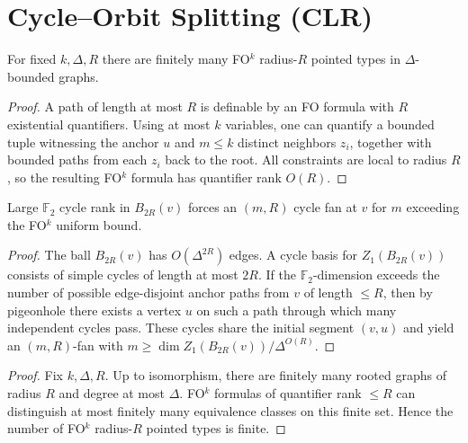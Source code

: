 \section*{Cycle--Orbit Splitting (CLR)}

\begin{lemma}
For fixed $k,\Delta,R$ there are finitely many FO$^k$ radius-$R$ pointed types in $\Delta$-bounded graphs.
\end{lemma}

\begin{proof}
A path of length at most $R$ is definable by an FO formula with $R$ existential quantifiers.
Using at most $k$ variables, one can quantify a bounded tuple witnessing the anchor $u$ and
$m\le k$ distinct neighbors $z_i$, together with bounded paths from each $z_i$ back to the root.
All constraints are local to radius $R$, so the resulting FO$^k$ formula has quantifier rank $O(R)$.
\end{proof}


\begin{lemma}
Large $\mathbb F_2$ cycle rank in $B_{2R}(v)$ forces an $(m,R)$ cycle fan at $v$ for $m$ exceeding the FO$^k$ uniform bound.
\end{lemma}

\begin{proof}
The ball $B_{2R}(v)$ has $O(\Delta^{2R})$ edges.
A cycle basis for $Z_1(B_{2R}(v))$ consists of simple cycles of length at most $2R$.
If the $\mathbb F_2$-dimension exceeds the number of possible edge-disjoint anchor paths from $v$ of length $\le R$,
then by pigeonhole there exists a vertex $u$ on such a path through which many independent cycles pass.
These cycles share the initial segment $(v,u)$ and yield an $(m,R)$-fan with
$m \ge \dim Z_1(B_{2R}(v))/\Delta^{O(R)}$.
\end{proof}

\begin{proof}
Fix $k,\Delta,R$. Up to isomorphism, there are finitely many rooted graphs of radius $R$ and degree at most $\Delta$.
FO$^k$ formulas of quantifier rank $\le R$ can distinguish at most finitely many equivalence classes on this finite set.
Hence the number of FO$^k$ radius-$R$ pointed types is finite.
\end{proof}

